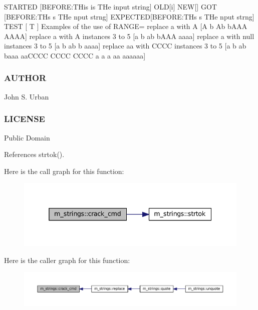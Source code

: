 S\+T\+A\+R\+T\+ED \mbox{[}B\+E\+F\+O\+RE\+:T\+His is T\+He input string\mbox{]} O\+LD\mbox{[}i\mbox{]} N\+EW\mbox{[}\mbox{]} G\+OT \mbox{[}B\+E\+F\+O\+RE\+:T\+Hs s T\+He nput strng\mbox{]} E\+X\+P\+E\+C\+T\+ED\mbox{[}B\+E\+F\+O\+RE\+:T\+Hs s T\+He nput strng\mbox{]} T\+E\+ST \mbox{[} T \mbox{]} Examples of the use of R\+A\+N\+GE= replace a with A \mbox{[}A b Ab b\+A\+AA A\+A\+AA\mbox{]} replace a with A instances 3 to 5 \mbox{[}a b ab b\+A\+AA aaaa\mbox{]} replace a with null instances 3 to 5 \mbox{[}a b ab b aaaa\mbox{]} replace aa with C\+C\+CC instances 3 to 5 \mbox{[}a b ab baaa aa\+C\+C\+CC C\+C\+CC C\+C\+CC a a a aa aaaaaa\mbox{]}

\subsubsection*{A\+U\+T\+H\+OR}

John S. Urban \subsubsection*{L\+I\+C\+E\+N\+SE}

Public Domain 

References strtok().

Here is the call graph for this function\+:\nopagebreak
\begin{figure}[H]
\begin{center}
\leavevmode
\includegraphics[width=338pt]{namespacem__strings_a818d715927dd61c1be6df5d2cdec4e4c_cgraph}
\end{center}
\end{figure}
Here is the caller graph for this function\+:\nopagebreak
\begin{figure}[H]
\begin{center}
\leavevmode
\includegraphics[width=350pt]{namespacem__strings_a818d715927dd61c1be6df5d2cdec4e4c_icgraph}
\end{center}
\end{figure}
\mbox{\label{namespacem__strings_a7030d33ae9e65d8cf2e2cb9332ffdac0}} 
